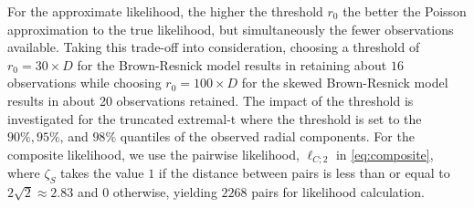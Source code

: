 \documentclass[lineno]{biometrika}
\begin{document}
For the approximate likelihood, the higher the threshold $r_0$ the better the Poisson approximation to the true likelihood, but simultaneously the fewer observations available. Taking this trade-off into consideration, choosing a threshold of
$r_0 = 30\times D$ for the Brown-Resnick model
results in retaining about $16$ observations while choosing $r_0 = 100\times D$ for the skewed Brown-Resnick model results in about 20 observations retained. The impact of the threshold is investigated for the truncated extremal-t where the threshold is set to the $90\%, 95\%$, and $98\%$ quantiles of the observed radial components. For the composite likelihood, we use the pairwise likelihood, $\ell_{C;2}$ in \eqref{eq:composite}, where $\zeta_S$ takes the value $1$ if the distance between pairs is less than or equal to $2\sqrt{2}\approx 2.83$ and $0$ otherwise, yielding $2268$ pairs for likelihood calculation.
\end{document}
